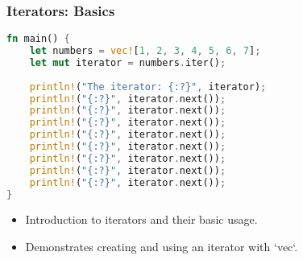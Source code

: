 \documentclass[aspectratio=169, table]{beamer}
\begin{document}
\begin{frame}[fragile]
\frametitle{Iterators: Basics}
\begin{lstlisting}[language=Rust]
fn main() {
	let numbers = vec![1, 2, 3, 4, 5, 6, 7];
	let mut iterator = numbers.iter();
	
	println!("The iterator: {:?}", iterator); 
	println!("{:?}", iterator.next());
	println!("{:?}", iterator.next());
	println!("{:?}", iterator.next());
	println!("{:?}", iterator.next());
	println!("{:?}", iterator.next());
	println!("{:?}", iterator.next());
	println!("{:?}", iterator.next());
	println!("{:?}", iterator.next());
}
\end{lstlisting}
\begin{itemize}
\item Introduction to iterators and their basic usage.
\item Demonstrates creating and using an iterator with `vec`.
\end{itemize}
\end{frame}
\end{document}
